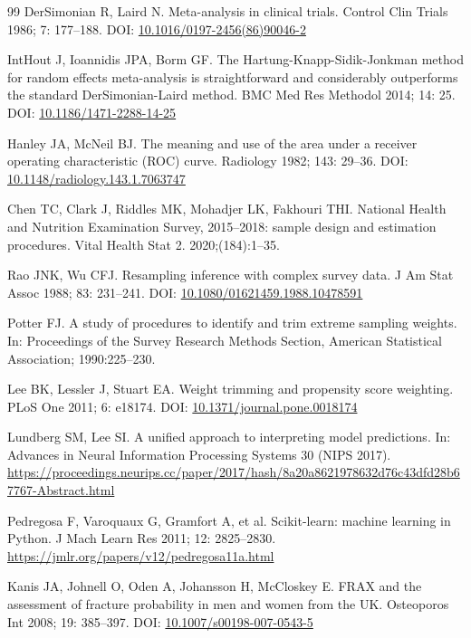 \documentclass[11pt,a4paper]{article}
\begin{document}
\begin{thebibliography}{99}
 DerSimonian R, Laird N. Meta-analysis in clinical trials. Control Clin Trials 1986; 7: 177--188. DOI: \href{https://doi.org/10.1016/0197-2456(86)90046-2}{10.1016/0197-2456(86)90046-2}

 IntHout J, Ioannidis JPA, Borm GF. The Hartung-Knapp-Sidik-Jonkman method for random effects meta-analysis is straightforward and considerably outperforms the standard DerSimonian-Laird method. BMC Med Res Methodol 2014; 14: 25. DOI: \href{https://doi.org/10.1186/1471-2288-14-25}{10.1186/1471-2288-14-25}

 Hanley JA, McNeil BJ. The meaning and use of the area under a receiver operating characteristic (ROC) curve. Radiology 1982; 143: 29--36. DOI: \href{https://doi.org/10.1148/radiology.143.1.7063747}{10.1148/radiology.143.1.7063747}

 Chen TC, Clark J, Riddles MK, Mohadjer LK, Fakhouri THI. National Health and Nutrition Examination Survey, 2015--2018: sample design and estimation procedures. Vital Health Stat 2. 2020;(184):1--35.

 Rao JNK, Wu CFJ. Resampling inference with complex survey data. J Am Stat Assoc 1988; 83: 231--241. DOI: \href{https://doi.org/10.1080/01621459.1988.10478591}{10.1080/01621459.1988.10478591}

 Potter FJ. A study of procedures to identify and trim extreme sampling weights. In: Proceedings of the Survey Research Methods Section, American Statistical Association; 1990:225--230.

 Lee BK, Lessler J, Stuart EA. Weight trimming and propensity score weighting. PLoS One 2011; 6: e18174. DOI: \href{https://doi.org/10.1371/journal.pone.0018174}{10.1371/journal.pone.0018174}

 Lundberg SM, Lee SI. A unified approach to interpreting model predictions. In: Advances in Neural Information Processing Systems 30 (NIPS 2017). \url{https://proceedings.neurips.cc/paper/2017/hash/8a20a8621978632d76c43dfd28b67767-Abstract.html}

 Pedregosa F, Varoquaux G, Gramfort A, et al. Scikit-learn: machine learning in Python. J Mach Learn Res 2011; 12: 2825--2830. \url{https://jmlr.org/papers/v12/pedregosa11a.html}

 Kanis JA, Johnell O, Oden A, Johansson H, McCloskey E. FRAX and the assessment of fracture probability in men and women from the UK. Osteoporos Int 2008; 19: 385--397. DOI: \href{https://doi.org/10.1007/s00198-007-0543-5}{10.1007/s00198-007-0543-5}


\end{thebibliography}
\end{document}
